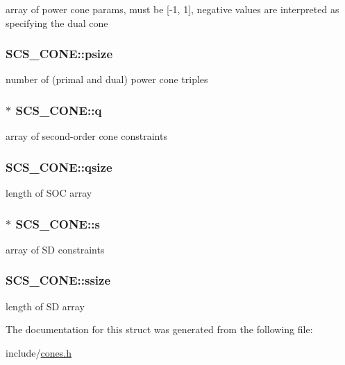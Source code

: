 array of power cone params, must be  \mbox{[}-\/1, 1\mbox{]}, negative values are interpreted as specifying the dual cone \hypertarget{struct_s_c_s___c_o_n_e_a9e0fef883941e507c80f04ccae4c822a}{
\subsubsection[{psize}]{ S\-C\-S\-\_\-\-C\-O\-N\-E\-::psize}}\label{struct_s_c_s___c_o_n_e_a9e0fef883941e507c80f04ccae4c822a}
number of (primal and dual) power cone triples \hypertarget{struct_s_c_s___c_o_n_e_af056b31b1537a71fe87f2a32f7fa4177}{
\subsubsection[{q}]{$\ast$ S\-C\-S\-\_\-\-C\-O\-N\-E\-::q}}\label{struct_s_c_s___c_o_n_e_af056b31b1537a71fe87f2a32f7fa4177}
array of second-\/order cone constraints \hypertarget{struct_s_c_s___c_o_n_e_a8d86840460aaed0210c107627914453b}{
\subsubsection[{qsize}]{ S\-C\-S\-\_\-\-C\-O\-N\-E\-::qsize}}\label{struct_s_c_s___c_o_n_e_a8d86840460aaed0210c107627914453b}
length of S\-O\-C array \hypertarget{struct_s_c_s___c_o_n_e_a8400cfd0fc6f3ccdb89b6ddcc74d2732}{
\subsubsection[{s}]{$\ast$ S\-C\-S\-\_\-\-C\-O\-N\-E\-::s}}\label{struct_s_c_s___c_o_n_e_a8400cfd0fc6f3ccdb89b6ddcc74d2732}
array of S\-D constraints \hypertarget{struct_s_c_s___c_o_n_e_a743ed457f561a65bc02af67d3fe1d29f}{
\subsubsection[{ssize}]{ S\-C\-S\-\_\-\-C\-O\-N\-E\-::ssize}}\label{struct_s_c_s___c_o_n_e_a743ed457f561a65bc02af67d3fe1d29f}
length of S\-D array 

The documentation for this struct was generated from the following file\-:\begin{DoxyCompactItemize}
\item 
include/\hyperlink{cones_8h}{cones.\-h}\end{DoxyCompactItemize}
